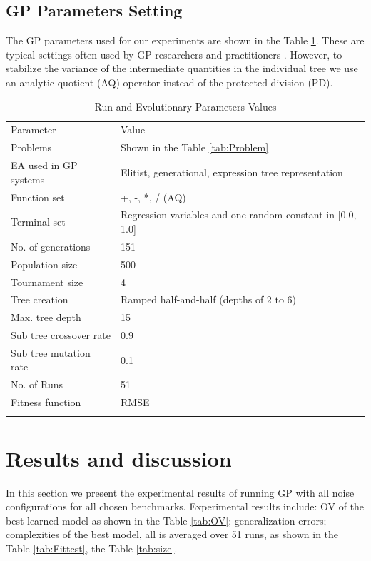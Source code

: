 \subsection{GP Parameters Setting}
\label{GPP}
The GP parameters used for our experiments are shown in the Table \ref{tab:Parameter}. These are typical settings often used by GP researchers and practitioners \cite{1992Koza}. However, to stabilize the variance of the intermediate quantities in the individual tree we use an analytic quotient (AQ) operator \cite{Ni2013} instead of the protected division (PD).
\begin{table}
\caption{Run and Evolutionary Parameters Values}
\label{tab:Parameter}       %
\begin{tabular}{ll}
\hline\noalign{\smallskip}
Parameter & Value \\
\noalign{\smallskip}\hline\noalign{\smallskip}
Problems &	Shown in the Table \ref{tab:Problem}  \\
EA used in GP systems &	Elitist, generational, expression tree representation \\
Function set &	+, -, *, / (AQ) \\
Terminal set &	Regression variables and one random constant in [0.0, 1.0] \\
No. of generations	& 151 \\
Population size	& 500 \\
Tournament size &	4 \\
Tree creation	& Ramped half-and-half (depths of 2 to 6) \\
Max. tree depth	& 15 \\
Sub tree crossover rate	& 0.9 \\
Sub tree mutation rate & 0.1 \\
No.  of Runs & 51 \\
Fitness function & RMSE \\
\noalign{\smallskip}\hline
\end{tabular}
\end{table}
\section {Results and discussion}
\label{Res}
In this section we present the experimental results of running GP with all noise configurations for all chosen benchmarks. Experimental results include: OV of the best learned model as shown in the Table \ref{tab:OV}; generalization errors; complexities of the best model, all is averaged over 51 runs, as shown in the Table \ref{tab:Fittest}, the Table \ref{tab:size}.
